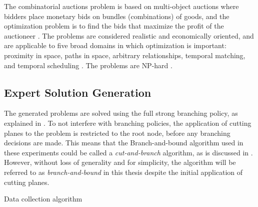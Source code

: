 The combinatorial auctions problem is based on multi-object auctions where bidders place monetary bids on bundles (combinations) of goods, and the optimization problem is to find the bids that maximize the profit of the auctioneer \cite{brown2000towards}. The problems are considered realistic and economically oriented, and are applicable to five broad domains in which optimization is important: proximity in space, paths in space, arbitrary relationships, temporal matching, and temporal scheduling \cite{brown2000towards}. The problems are \gls{NP}-hard \cite{dong2012combinatorial}. 









\subsection{Expert Solution Generation}\label{ssec:expertsolutiongeneration}

The generated problems are solved using the full strong branching policy, as explained in . To not interfere with branching policies, the application of cutting planes to the problem is restricted to the root node, before any branching decisions are made. This means that the Branch-and-bound algorithm used in these experiments could be called a \textit{cut-and-branch} algorithm, as is discussed in .
However, without loss of generality and for simplicity, the algorithm will be referred to as \textit{branch-and-bound} in this thesis despite the initial application of cutting planes.  


\begin{algorithm}[H]
    \SetAlgoLined
    
    \caption{\label{alg:datacol} Data collection algorithm}
\end{algorithm}


